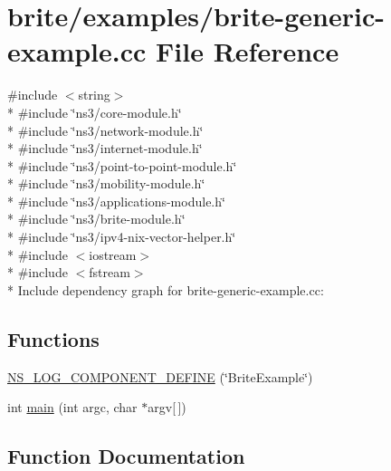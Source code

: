 \hypertarget{brite-generic-example_8cc}{}\section{brite/examples/brite-\/generic-\/example.cc File Reference}
\label{brite-generic-example_8cc}
{\ttfamily \#include $<$string$>$}\\*
{\ttfamily \#include \char`\"{}ns3/core-\/module.\+h\char`\"{}}\\*
{\ttfamily \#include \char`\"{}ns3/network-\/module.\+h\char`\"{}}\\*
{\ttfamily \#include \char`\"{}ns3/internet-\/module.\+h\char`\"{}}\\*
{\ttfamily \#include \char`\"{}ns3/point-\/to-\/point-\/module.\+h\char`\"{}}\\*
{\ttfamily \#include \char`\"{}ns3/mobility-\/module.\+h\char`\"{}}\\*
{\ttfamily \#include \char`\"{}ns3/applications-\/module.\+h\char`\"{}}\\*
{\ttfamily \#include \char`\"{}ns3/brite-\/module.\+h\char`\"{}}\\*
{\ttfamily \#include \char`\"{}ns3/ipv4-\/nix-\/vector-\/helper.\+h\char`\"{}}\\*
{\ttfamily \#include $<$iostream$>$}\\*
{\ttfamily \#include $<$fstream$>$}\\*
Include dependency graph for brite-\/generic-\/example.cc\+:
\subsection*{Functions}
\begin{DoxyCompactItemize}
\item 
\hyperlink{brite-generic-example_8cc_acaaa2b61e1bcfb38d779d8381c1885aa}{N\+S\+\_\+\+L\+O\+G\+\_\+\+C\+O\+M\+P\+O\+N\+E\+N\+T\+\_\+\+D\+E\+F\+I\+NE} (\char`\"{}Brite\+Example\char`\"{})
\item 
int \hyperlink{brite-generic-example_8cc_a0ddf1224851353fc92bfbff6f499fa97}{main} (int argc, char $\ast$argv\mbox{[}$\,$\mbox{]})
\end{DoxyCompactItemize}


\subsection{Function Documentation}
